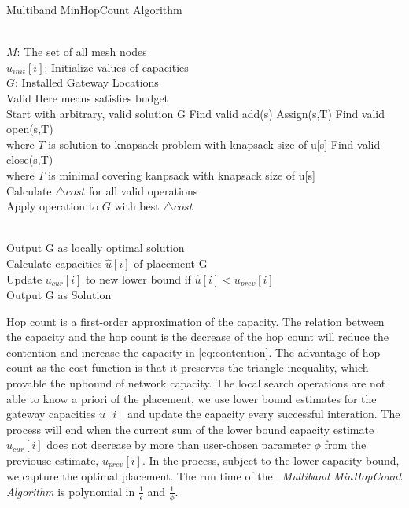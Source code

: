 	  \begin{algorithm}
          \small
	  \caption{Multiband MinHopCount Algorithm}
	  \label{algorithms: Minihop}
	  \begin{algorithmic}[1]
	  \REQUIRE  ~~\\
		 $M$: The set of all mesh nodes\\
		 $u_{init}[i]$: Initialize values of capacities
\ENSURE ~~\\    
$G$: Installed Gateway Locations \\
Valid Here means satisfies budget \\
Start with arbitrary, valid solution G
\STATE Find valid add(s)
\STATE Assign(s,T)
\STATE Find valid open(s,T) \\
where $T$ is solution to knapsack problem with knapsack size of u[s]
\STATE  Find valid close(s,T) \\
where $T$ is minimal covering kanpsack with knapsack size of u[s] \\
Calculate $\triangle cost$ for all valid operations\\
Apply operation to $G$ with best $\triangle cost$

\ENDWHILE
\\Output G as locally optimal solution\\
Calculate capacities $\hat{u}[i]$ of placement G\\
Update $u_{cur}[i]$ to new lower bound if $\hat{u}[i] < u_{prev}[i]$ \\
\ENDWHILE 
\ENDFOR
Output G as Solution
\end{algorithmic}
\end{algorithm}
      


	Hop count is a first-order approximation of the capacity. The relation between the capacity and the hop count is the decrease of the hop count will reduce the contention and increase the capacity in \ref{eq:contention}.
			The advantage of hop count as the cost function is that it preserves the triangle inequality, which provable the upbound of network capacity.
The local search operations are not able to know a priori of the placement, we use lower bound estimates for the gateway capacities $u[i]$ and update the capacity every successful interation.
The process will end when the current sum of the lower bound capacity estimate $u_{cur}[i]$ does not decrease by more than user-chosen parameter $\phi$ from the previouse estimate, $u_{prev}[i]$.
In the process, subject to the lower capacity bound, we capture the optimal placement. The run time of the ~\emph{Multiband MinHopCount Algorithm} is polynomial in $\frac{1}{\epsilon}$ and $\frac{1}{\phi}$.


